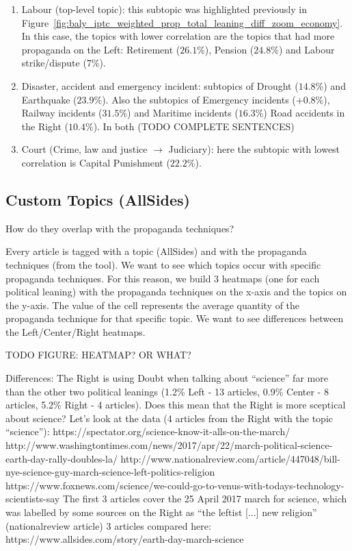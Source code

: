 \begin{enumerate}
    \item Labour (top-level topic): this subtopic was highlighted previously in Figure~\ref{fig:baly_iptc_weighted_prop_total_leaning_diff_zoom_economy}. In this case, the topics with lower correlation are the topics that had more propaganda on the Left:  Retirement ($26.1\%$), Pension ($24.8\%$) and Labour strike/dispute ($7\%$).
    \item Disaster, accident and emergency incident: subtopics of Drought ($14.8\%$) and Earthquake ($23.9\%$). Also the subtopics of Emergency incidents ($+0.8\%$), Railway incidents ($31.5\%$) and Maritime incidents ($16.3\%$) Road accidents in the Right ($10.4\%$). In both (TODO COMPLETE SENTENCES)
    \item Court (Crime, law and justice $\rightarrow$ Judiciary): here the subtopic with lowest correlation is Capital Punishment ($22.2\%$).
\end{enumerate}


\subsection{Custom Topics (AllSides)}

How do they overlap with the propaganda techniques?

Every article is tagged with a topic (AllSides) and with the propaganda techniques (from the tool).
We want to see which topics occur with specific propaganda techniques.
For this reason, we build 3 heatmaps (one for each political leaning) with the propaganda techniques on the x-axis and the topics on the y-axis. The value of the cell represents the average quantity of the propaganda technique for that specific topic.
We want to see differences between the Left/Center/Right heatmaps.

TODO FIGURE: HEATMAP? OR WHAT?

Differences:
The Right is using Doubt when talking about “science” far more than the other two political leanings (1.2\% Left - 13 articles, 0.9\% Center - 8 articles, 5.2\% Right - 4 articles). Does this mean that the Right is more sceptical about science? Let’s look at the data (4 articles from the Right with the topic “science”):
https://spectator.org/science-know-it-alls-on-the-march/
http://www.washingtontimes.com/news/2017/apr/22/march-political-science-earth-day-rally-doubles-la/ 
http://www.nationalreview.com/article/447048/bill-nye-science-guy-march-science-left-politics-religion
https://www.foxnews.com/science/we-could-go-to-venus-with-todays-technology-scientists-say 
The first 3 articles cover the 25 April 2017 march for science, which was labelled by some sources on the Right as “the leftist [...] new religion” (nationalreview article)
3 articles compared here: https://www.allsides.com/story/earth-day-march-science 

